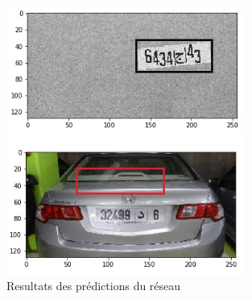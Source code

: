 \begin{frame}
\begin{columns}
\begin{column}{6cm}
\begin{figure}
\begin{overprint}
            \centering\includegraphics[width=0.7\textwidth]{figures/Resultats_1.PNG}\caption{Resultats des prédictions du réseau}
        \end{overprint}
    \end{figure}
\end{column}
\end{columns}
\end{frame}


